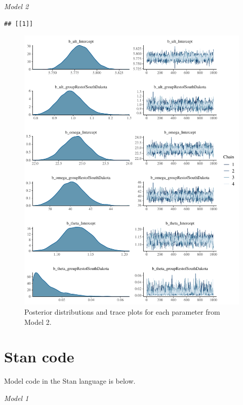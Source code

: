 \documentclass[
]{article}
\begin{document}
\emph{Model 2}

\begin{verbatim}
## [[1]]
\end{verbatim}

\begin{figure}
\centering
\includegraphics{manuscript_files/figure-latex/unnamed-chunk-9-1.pdf}
\caption{\label{fig:unnamed-chunk-9}Posterior distributions and trace plots for each parameter from Model 2.}
\end{figure}

\newpage

\FloatBarrier

\hypertarget{stan-code}{%
\section{Stan code}\label{stan-code}}

Model code in the Stan language is below.

\emph{Model 1}
\end{document}
